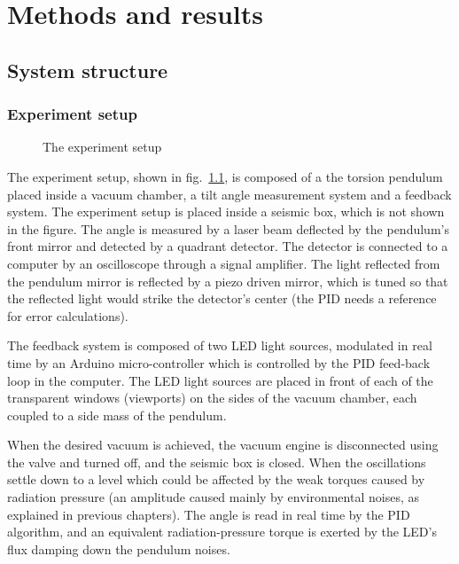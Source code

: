\documentclass[\main/master.tex]{subfiles}
\begin{document}
\chapter{Methods and results}\label{chapter:Methods and results}

\section{System structure}
\subsection{Experiment setup}
\begin{figure}[htbp]
	\centering
	\caption[The experiment setup]{The experiment setup}
	\label{fig:setup}
\end{figure}
\FloatBarrier
\par\noindent
The experiment setup, shown in fig.~\ref{fig:setup}, is composed of a the torsion pendulum placed inside a vacuum chamber, a tilt angle measurement system and a feedback system. The experiment setup is placed inside a seismic box, which is not shown in the figure. The angle is measured by a laser beam deflected by the pendulum's front mirror and detected by a quadrant detector. The detector is connected to a computer by an oscilloscope through a signal amplifier. The light reflected from the pendulum mirror is reflected by a piezo driven mirror, which is tuned so that the reflected light would strike the detector's center (the PID needs a reference for error calculations). 
\par\noindent
The feedback system is composed of two LED light sources, modulated in real time by an Arduino micro-controller which is controlled by the PID feed-back loop in the computer. The LED light sources are placed in front of each of the transparent windows (viewports) on the sides of the vacuum chamber, each coupled to a side mass of the pendulum. 
\par\noindent
When the desired vacuum is achieved, the vacuum engine is disconnected using the valve and turned off, and the seismic box is closed. When the oscillations settle down to a level which could be affected by the weak torques caused by radiation pressure (an amplitude caused mainly by environmental noises, as explained in previous chapters). The angle is read in real time by the PID algorithm, and an equivalent radiation-pressure torque is exerted by the LED's flux damping down the pendulum noises.
\end{document}
